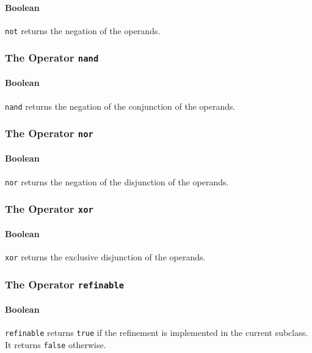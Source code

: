 \paragraph{Boolean}
\verb!not! returns the negation of the operands.

\subsubsection{The Operator {\tt nand}}
\paragraph{Boolean}
\verb!nand! returns the negation of the conjunction of the operands.

\subsubsection{The Operator {\tt nor}}
\paragraph{Boolean}
\verb!nor! returns the negation of the disjunction of the operands.

\subsubsection{The Operator {\tt xor}}
\paragraph{Boolean}
\verb!xor! returns the exclusive disjunction of the operands.

\subsubsection{The Operator {\tt refinable}}
\paragraph{Boolean}
\verb!refinable! returns \verb!true! if the refinement is implemented in the current subclass. It returns \verb!false! otherwise.